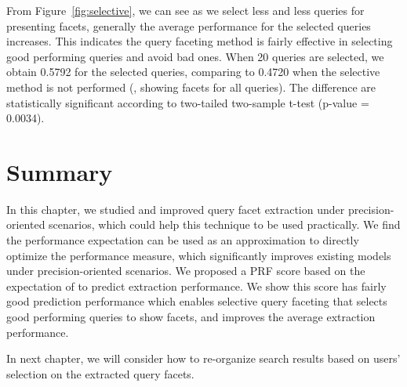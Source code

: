 From Figure~\ref{fig:selective}, we can see as we select less and less queries for presenting facets, generally the average performance for the selected queries increases. This indicates the query faceting method is fairly effective in selecting good performing queries and avoid bad ones. When 20 queries are selected, we obtain 0.5792  for the selected queries, comparing to 0.4720 when the selective method is not performed (\ie, showing facets for all queries). The difference are statistically significant according to two-tailed two-sample t-test (p-value = 0.0034). 


\section{Summary}
\label{sec:precision-conclusion}
In this chapter, we studied and improved query facet extraction under precision-oriented scenarios, which could help this technique to be used practically. We find the performance expectation can be used as an approximation to directly optimize the performance measure, which significantly improves existing models under precision-oriented scenarios. We proposed a PRF score based on the expectation of \PRF to predict extraction performance. We show this score has fairly good prediction performance which enables selective query faceting that selects good performing queries to show facets, and improves the average extraction performance.

In next chapter, we will consider how to re-organize search results based on users' selection on the extracted query facets.